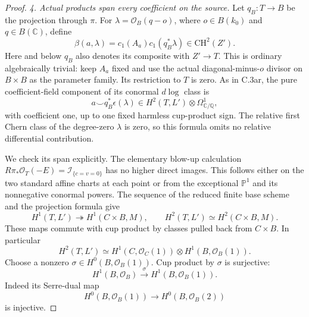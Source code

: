 \begin{proof}
\emph{4. Actual products span every coefficient on the source.}
Let $q_B:T\to B$ be the projection through $\pi$. For
$\lambda=\mathcal O_B(q-o)$, where $o\in B(k_0)$ and
$q\in B(\mathbb C)$, define
\[
             \beta(a,\lambda)
               =c_1(A_a)c_1(q_B^*\lambda)
                         \in\mathrm{CH}^2(Z').
\]
Here and below $q_B$ also denotes its composite with $Z'\to T$.
This is ordinary algebraically trivial: keep $A_a$ fixed and
use the actual diagonal-minus-$o$ divisor on $B\times B$ as
the parameter family. Its restriction to $T$ is zero.
As in C.3ar, the pure coefficient-field component of its
conormal $d\log$ class is
\begin{equation}\label{eq:C3au-product}
       a\smile q_B^*\epsilon(\lambda)
        \in H^2(T,L')\otimes\Omega^1_{\mathbb C/\mathbb Q},
\end{equation}
with coefficient one, up to one fixed harmless cup-product sign.
The relative first Chern class of the degree-zero $\lambda$ is
zero, so this formula omits no relative differential contribution.

We check its span explicitly. The elementary blow-up calculation
$R\pi_*\mathcal O_T(-E)=\mathcal I_{\{c=v=0\}}$ has no higher
direct images. This follows either on the two standard affine
charts at each point or from the exceptional $\mathbb P^1$ and
its nonnegative conormal powers. The sequence of the reduced
finite base scheme and the projection formula give
\begin{equation}\label{eq:C3au-coherent}
 H^1(T,L')\twoheadrightarrow H^1(C\times B,M),
 \qquad H^2(T,L')\simeq H^2(C\times B,M).
\end{equation}
These maps commute with cup product by classes pulled back from
$C\times B$. In particular
\[
 H^2(T,L')\simeq
 H^1(C,\mathcal O_C(1))\otimes H^1(B,\mathcal O_B(1)).
\]
Choose a nonzero $\sigma\in H^0(B,\mathcal O_B(1))$.
Cup product by $\sigma$ is surjective:
\[
       H^1(B,\mathcal O_B)\xrightarrow{\,\sigma\,}
                          H^1(B,\mathcal O_B(1)).
\]
Indeed its Serre-dual map
\[
       H^0(B,\mathcal O_B(1))\longrightarrow H^0(B,\mathcal O_B(2))
\]
is injective.


\end{proof}
